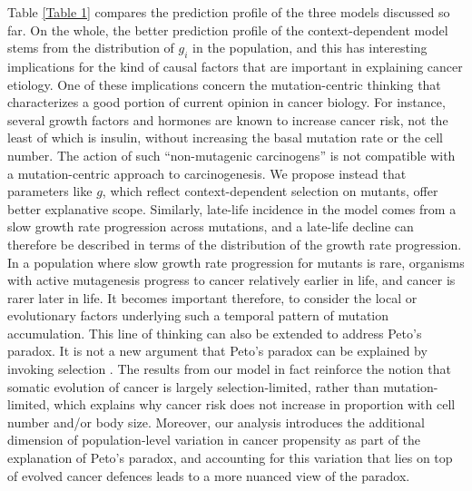 \documentclass[10pt,twocolumn,twoside]{article}
\begin{document}
Table \ref{Table 1} compares the prediction profile of the three models discussed so far. On the whole, the better prediction profile of the context-dependent model stems from the distribution of $g_{i}$ in the population, and this has interesting implications for the kind of causal factors that are important in explaining cancer etiology. One of these implications concern the mutation-centric thinking that characterizes a good portion of current opinion in cancer biology. For instance, several growth factors and hormones are known to increase cancer risk, not the least of which is insulin, without increasing the basal mutation rate or the cell number. The action of such ``non-mutagenic carcinogens'' is not compatible with a mutation-centric approach to carcinogenesis. We propose instead that parameters like $g$, which reflect context-dependent selection on mutants, offer better explanative scope.
Similarly, late-life incidence in the model comes from a slow growth rate progression across mutations, and a late-life decline can therefore be described in terms of the distribution of the growth rate progression. In a population where slow growth rate progression for mutants is rare, organisms with active mutagenesis progress to cancer relatively earlier in life, and cancer is rarer later in life. It becomes important therefore, to consider the local or evolutionary factors underlying such a temporal pattern of mutation accumulation.
This line of thinking can also be extended to address Peto's paradox. It is not a new argument that Peto's paradox can be explained by invoking selection \cite{Caulin2011,Noble2015,Tollis2017b}. The results from our model in fact reinforce the notion that somatic evolution of cancer is largely selection-limited, rather than mutation-limited, which explains why cancer risk does not increase in proportion with cell number and/or body size. Moreover, our analysis introduces the additional dimension of population-level variation in cancer propensity as part of the explanation of Peto's paradox, and accounting for this variation that lies on top of evolved cancer defences leads to a more nuanced view of the paradox.
\end{document}
